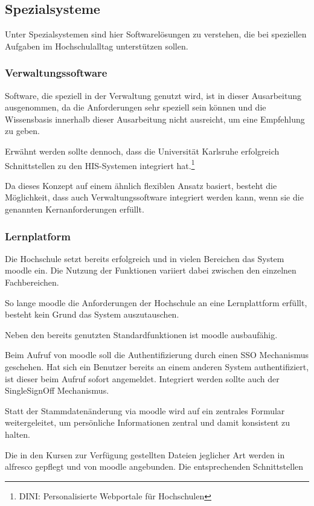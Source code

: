 \documentclass[a4paper]{article}
\begin{document}
\clearpage\subsection{Spezialsysteme}
{\sffamily
Unter Spezialsystemen sind hier Softwarelösungen zu verstehen, die bei speziellen Aufgaben im Hochschulalltag
unterstützen sollen.}

\subsubsection{Verwaltungssoftware}
{\sffamily
Software, die speziell in der Verwaltung genutzt wird, ist in dieser Ausarbeitung ausgenommen, da die Anforderungen sehr
speziell sein können und die Wissensbasis innerhalb dieser Ausarbeitung nicht ausreicht, um eine Empfehlung zu geben.}

{\sffamily
Erwähnt werden sollte dennoch, dass die Universität Karlsruhe erfolgreich Schnittstellen zu den HIS-Systemen integriert
hat.\footnote{DINI: Personalisierte Webportale für Hochschulen}}

{\sffamily
Da dieses Konzept auf einem ähnlich flexiblen Ansatz basiert, besteht die Möglichkeit, dass auch Verwaltungssoftware
integriert werden kann, wenn sie die genannten Kernanforderungen erfüllt.}

\subsubsection{Lernplatform}
{\sffamily
Die Hochschule setzt bereits erfolgreich und in vielen Bereichen das System moodle ein. Die Nutzung der Funktionen
variiert dabei zwischen den einzelnen Fachbereichen.}

{\sffamily
So lange moodle die Anforderungen der Hochschule an eine Lernplattform erfüllt, besteht kein Grund das System
auszutauschen.}

{\sffamily
Neben den bereits genutzten Standardfunktionen ist moodle ausbaufähig.}

{\sffamily
Beim Aufruf von moodle soll die Authentifizierung durch einen SSO Mechanismus geschehen. Hat sich ein Benutzer bereits
an einem anderen System authentifiziert, ist dieser beim Aufruf sofort angemeldet. Integriert werden sollte auch der
SingleSignOff Mechanismus.}

{\sffamily
Statt der Stammdatenänderung via moodle wird auf ein zentrales Formular weitergeleitet, um persönliche Informationen
zentral und damit konsistent zu halten.}

{\sffamily
Die in den Kursen zur Verfügung gestellten Dateien jeglicher Art werden in alfresco gepflegt und von moodle angebunden.
Die entsprechenden Schnittstellen}
\end{document}
